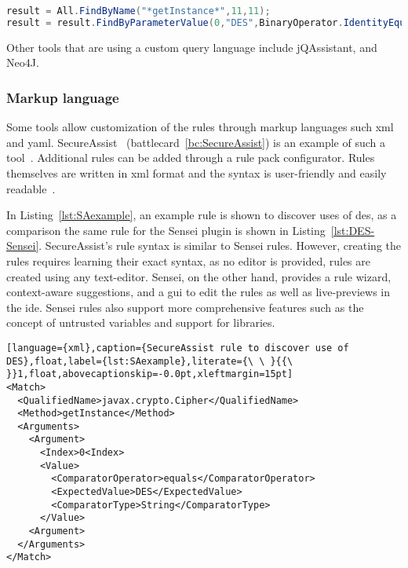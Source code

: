 \begin{lstlisting}[language={Java},caption={CxQuery query used by Checkmarx to find use of insecure algorithm DES.},label={lst:detectDES-checkmarx},float,abovecaptionskip=-0.0pt,xleftmargin=15pt]
result = All.FindByName("*getInstance*",11,11);
result = result.FindByParameterValue(0,"DES",BinaryOperator.IdentityEquality);
\end{lstlisting}

Other tools that are using a custom query language include jQAssistant, and Neo4J.

\subsubsection{Markup language}
Some tools allow customization of the rules through markup languages such \gls{xml} and \gls{yaml}.
SecureAssist~\cite{secureassist} (battlecard~\ref{bc:SecureAssist}) is an example of such a tool~\cite{sastinide}. 
Additional rules can be added through a rule pack configurator.
Rules themselves are written in \gls{xml} format and the syntax is user-friendly and easily readable~\cite{secureassistruletutorial}.

In Listing~\ref{lst:SAexample}, an example rule is shown to discover uses of \gls{des}, as a comparison the same rule for the Sensei plugin is shown in Listing~\ref{lst:DES-Sensei}.
SecureAssist's rule syntax is similar to Sensei rules.
However, creating the rules requires learning their exact syntax, as no editor is provided, rules are created using any text-editor.
Sensei, on the other hand, provides a rule wizard, context-aware suggestions, and a \gls{gui} to edit the rules as well as live-previews in the \gls{ide}.
Sensei rules also support more comprehensive features such as the concept of untrusted variables and support for libraries.

\begin{lstlisting}[language={xml},caption={SecureAssist rule to discover use of DES},float,label={lst:SAexample},literate={\ \ }{{\ }}1,float,abovecaptionskip=-0.0pt,xleftmargin=15pt] 
<Match>
  <QualifiedName>javax.crypto.Cipher</QualifiedName>
  <Method>getInstance</Method>
  <Arguments>
    <Argument>
      <Index>0<Index>
      <Value>
        <ComparatorOperator>equals</ComparatorOperator>
        <ExpectedValue>DES</ExpectedValue>
        <ComparatorType>String</ComparatorType>
      </Value>
    <Argument>
  </Arguments>
</Match>
\end{lstlisting}

